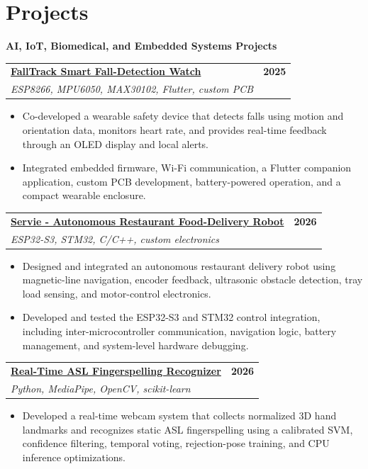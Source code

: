 \documentclass[a4paper,10pt]{article}
\makeatletter
\newcommand{\projectEntry}[3]{%
  \Needspace{9\baselineskip}%
  \begin{tabularx}{\textwidth}{@{}Xr@{}}
    \textbf{#1} & \textbf{\small #3} \\
    {\small\textit{#2}} &
  \end{tabularx}
  \vspace{0.35mm}
}
\newcommand{\projectCategory}[1]{%
  \vspace{1.0mm}
  {\normalsize\bfseries\color{accent} #1}\par
  \vspace{0.75mm}
}
\makeatother
\begin{document}
\section{Projects}

\projectCategory{AI, IoT, Biomedical, and Embedded Systems Projects}

\projectEntry
  {\href{https://github.com/hakammra/falltrack-watch}{FallTrack Smart Fall-Detection Watch \faGithub}}
  {ESP8266, MPU6050, MAX30102, Flutter, custom PCB}
  {2025}
\begin{itemize}
  \item Co-developed a wearable safety device that detects falls using motion and orientation data, monitors heart rate, and provides real-time feedback through an OLED display and local alerts.
  \item Integrated embedded firmware, Wi-Fi communication, a Flutter companion application, custom PCB development, battery-powered operation, and a compact wearable enclosure.
\end{itemize}
\vspace{1.35mm}

\projectEntry
  {\href{https://github.com/hakammra/Restaurent-Robot}{Servie - Autonomous Restaurant Food-Delivery Robot \faGithub}}
  {ESP32-S3, STM32, C/C++, custom electronics}
  {2026}
\begin{itemize}
  \item Designed and integrated an autonomous restaurant delivery robot using magnetic-line navigation, encoder feedback, ultrasonic obstacle detection, tray load sensing, and motor-control electronics.
  \item Developed and tested the ESP32-S3 and STM32 control integration, including inter-microcontroller communication, navigation logic, battery management, and system-level hardware debugging.
\end{itemize}
\vspace{1.35mm}

\projectEntry
  {\href{https://github.com/hakammra/asl-fingerspelling-webcam}{Real-Time ASL Fingerspelling Recognizer \faGithub}}
  {Python, MediaPipe, OpenCV, scikit-learn}
  {2026}
\begin{itemize}
  \item Developed a real-time webcam system that collects normalized 3D hand landmarks and recognizes static ASL fingerspelling using a calibrated SVM, confidence filtering, temporal voting, rejection-pose training, and CPU inference optimizations.
\end{itemize}
\vspace{1.35mm}
\end{document}
